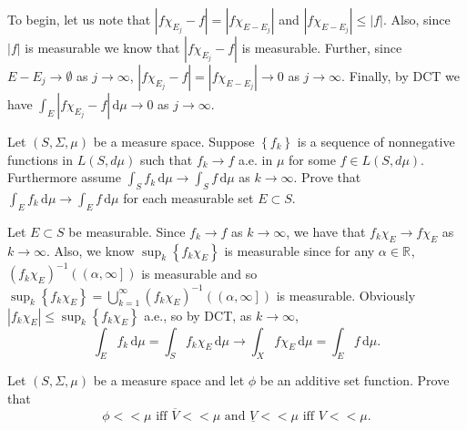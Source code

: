 \begin{solution}
  To begin, let us note that $\left| f \chi_{E_{j}} - f \right| = \left| f \chi_{E-E_{j}} \right|$ and $\left| f \chi_{E-E_{j}} \right| \leq \left| f \right|$.
  Also, since $\left| f \right|$ is measurable we know that $\left| f \chi_{E_{j}} - f \right|$ is measurable.
  Further, since $E-E_{j} \to \emptyset$ as $j \to \infty$, $\left| f \chi_{E_{j}} - f \right| = \left| f \chi_{E - E_{j}} \right| \to 0$ as $j \to \infty$.
  Finally, by DCT we have $\int_{E} \! \left| f \chi_{E_{j}} - f \right| \, \mathrm{d} \mu \to 0 $ as $ j \to \infty$.
\end{solution}

\pagebreak

\begin{problem}{5}
  Let $\left( S, \Sigma, \mu \right)$ be a measure space.
  Suppose $\left\{ f_{k} \right\}$ is a sequence of nonnegative functions in $L\left( S, d \mu \right)$ such that $f_{k} \to f$ a.e. in $\mu$ for some $f\in L\left( S,d \mu \right)$.
  Furthermore assume $\int_{S} \! f_{k} \, \mathrm{d} \mu \to \int_{S} \! f \, \mathrm{d} \mu $ as $k \to \infty$.
  Prove that $\int_{E} \! f_{k} \, \mathrm{d} \mu \to \int_{E} \! f \, \mathrm{d} \mu  $ for each measurable set $E \subset S$.
\end{problem}

\begin{solution}
  Let $E \subset S$ be measurable.
  Since $f_{k} \to f$ as $k \to \infty$, we have that $f_{k} \chi_{E} \to f \chi_{E}$ as $k \to \infty$.
  Also, we know $\sup_{k}\left\{ f_{k} \chi_{E} \right\}$ is measurable since for any $\alpha \in \mathbb{R}^{}$, $\left( f_{k} \chi_{E} \right)^{-1}\left( \left( \alpha,\infty \right] \right)$ is measurable and so $\sup_{k}\left\{ f_{k} \chi_{E} \right\} = \bigcup_{k=1}^{\infty}  \left( f_{k} \chi_{E} \right)^{-1}\left( \left( \alpha,\infty \right] \right)$ is measurable. 
  Obviously $\left| f_{k} \chi_{E} \right| \leq \sup_{k}\left\{ f_{k} \chi_{E} \right\}$ a.e., so by DCT, as $k \to \infty$, 
  \[
  \int_{E} \! f_{k} \, \mathrm{d} \mu = \int_{S} \! f_{k} \chi_{E} \, \mathrm{d} \mu \to \int_{X} \! f \chi_{E} \, \mathrm{d} \mu = \int_{E} \! f \, \mathrm{d} \mu    
  .\] 
\end{solution}

\pagebreak

\begin{problem}{6}
  Let $\left( S, \Sigma, \mu \right)$ be a measure space and let $\phi$ be an additive set function.
  Prove that
  \[
  \phi < < \mu \text{ iff } \overline{V} < < \mu \text{ and } \underline{V} < < \mu \text{ iff } V < < \mu
  .\] 
\end{problem}

